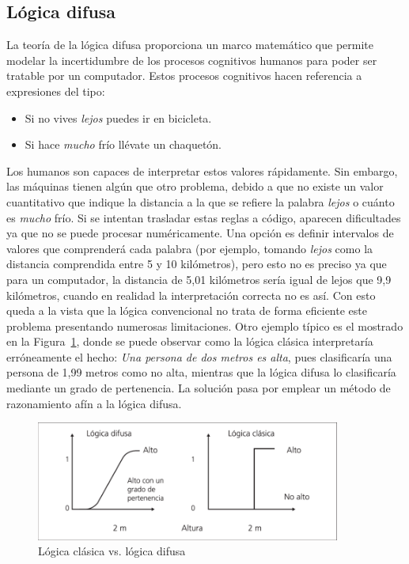 \subsection{Lógica difusa}
La teoría de la lógica difusa proporciona un marco matemático que permite modelar la incertidumbre de los procesos cognitivos humanos para poder ser tratable por un computador. Estos procesos cognitivos hacen referencia a expresiones del tipo:
\begin{itemize}
	\item Si no vives \textit{lejos} puedes ir en bicicleta.
	\item Si hace \textit{mucho} frío llévate un chaquetón.
\end{itemize}
Los humanos son capaces de interpretar estos valores rápidamente. Sin embargo, las máquinas tienen algún que otro problema, debido a que no existe un valor cuantitativo que indique la distancia a la que se refiere la palabra \textit{lejos} o cuánto es \textit{mucho} frío. Si se intentan trasladar estas reglas a código, aparecen dificultades ya que no se puede procesar numéricamente. Una opción es definir intervalos de valores que comprenderá cada palabra (por ejemplo, tomando \textit{lejos} como la distancia comprendida entre 5 y 10 kilómetros), pero esto no es preciso ya que para un computador, la distancia de 5,01 kilómetros sería igual de lejos que 9,9 kilómetros, cuando en realidad la interpretación correcta no es así. Con esto queda a la vista que la lógica convencional no trata de forma eficiente este problema presentando numerosas limitaciones. Otro ejemplo típico es el mostrado en la Figura~\ref{fig:ejemplo_logica}, donde se puede observar como la lógica clásica interpretaría erróneamente el hecho: \textit{Una persona de dos metros es alta}, pues clasificaría una persona de 1,99 metros como no alta, mientras que la lógica difusa lo clasificaría mediante un grado de pertenencia. La solución pasa por emplear un método de razonamiento afín a la lógica difusa.\\
\begin{figure}[!h]
	\centering
	\includegraphics[width=10cm]{figs/tipos_logica.png}
	\caption{Lógica clásica vs. lógica difusa}
        \label{fig:ejemplo_logica}
\end{figure}

